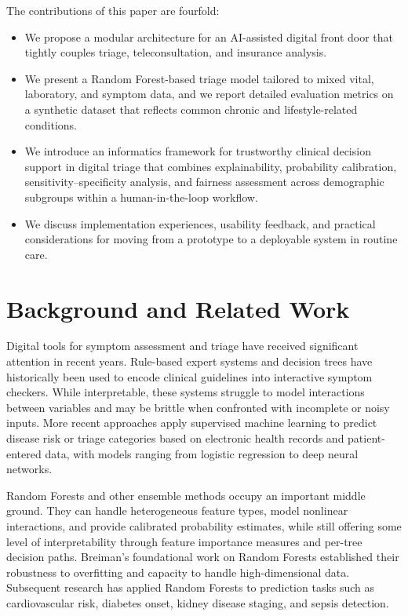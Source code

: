 \documentclass[conference]{IEEEtran}
\begin{document}
The contributions of this paper are fourfold:
\begin{itemize}
    \item We propose a modular architecture for an AI-assisted digital front door that tightly couples triage, teleconsultation, and insurance analysis.
    \item We present a Random Forest-based triage model tailored to mixed vital, laboratory, and symptom data, and we report detailed evaluation metrics on a synthetic dataset that reflects common chronic and lifestyle-related conditions.
    \item We introduce an informatics framework for trustworthy clinical decision support in digital triage that combines explainability, probability calibration, sensitivity--specificity analysis, and fairness assessment across demographic subgroups within a human-in-the-loop workflow.
    \item We discuss implementation experiences, usability feedback, and practical considerations for moving from a prototype to a deployable system in routine care.
\end{itemize}

\section{Background and Related Work}

Digital tools for symptom assessment and triage have received significant attention in recent years. Rule-based expert systems and decision trees have historically been used to encode clinical guidelines into interactive symptom checkers. While interpretable, these systems struggle to model interactions between variables and may be brittle when confronted with incomplete or noisy inputs. More recent approaches apply supervised machine learning to predict disease risk or triage categories based on electronic health records and patient-entered data, with models ranging from logistic regression to deep neural networks.

Random Forests and other ensemble methods occupy an important middle ground. They can handle heterogeneous feature types, model nonlinear interactions, and provide calibrated probability estimates, while still offering some level of interpretability through feature importance measures and per-tree decision paths. Breiman's foundational work on Random Forests established their robustness to overfitting and capacity to handle high-dimensional data. Subsequent research has applied Random Forests to prediction tasks such as cardiovascular risk, diabetes onset, kidney disease staging, and sepsis detection.
\end{document}
